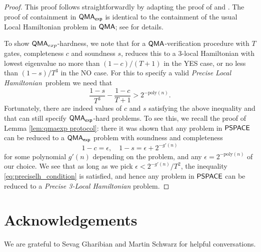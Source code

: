 \documentclass[11pt]{article}
\theoremstyle{definition}
\theoremstyle{remark}
\newcommand\QMA{{\sf{QMA}}}
\newcommand\PSPACE{{\sf{PSPACE}}}
\newcommand\QMAexp{{\sf{QMA}_{exp}}}
\newcommand\preciselh{\textit{Precise Local Hamiltonian}}
\newcommand\preciseilh[1]{\textit{Precise #1-Local Hamiltonian}}
\newcommand{\poly}{\textrm{poly}}
\begin{document}
\begin{proof}
This proof follows straightforwardly by adapting the proof of \cite{ksv02} and \cite{kr03}. The proof of containment in $\QMAexp$ is identical to the containment of the usual Local Hamiltonian problem in $\QMA$; see \cite{ksv02} for details.

To show $\QMA_{exp}$-hardness, we note that for a $\QMA$-verification procedure with $T$ gates, completeness $c$ and soundness $s$, \cite{kr03} reduces this to a 3-local Hamiltonian with lowest eigenvalue no more than $(1-c) / (T+1)$ in the YES case, or no less than $(1-s) / T^3$ in the NO case. For this to specify a valid \preciselh \ problem we need that
\begin{equation} \label{eq:preciselh_condition}
\frac{1-s}{T^3} - \frac{1-c}{T+1} > 2^{-\poly(n)}.
\end{equation}
Fortunately, there are indeed values of $c$ and $s$ satisfying the above inequality and that can still specify $\QMAexp$-hard problems. To see this, we recall the proof of Lemma \ref{lem:qmaexp protocol}: there it was shown that any problem in $\PSPACE$ can be reduced to a $\QMAexp$ problem with soundness and completeness
\begin{equation}
1-c = \epsilon,\quad 1 - s = \epsilon + 2^{-g'(n)}
\end{equation}
for some polynomial $g'(n)$ depending on the problem, and any $\epsilon = 2^{-\poly(n)}$ of our choice. We see that as long as we pick $\epsilon < 2^{-g'(n)}/T^2$, the inequality \ref{eq:preciselh_condition} is satisfied, and hence any problem in $\PSPACE$ can be reduced to a \preciseilh{3} problem.
\end{proof}
\section{Acknowledgements}
We are grateful to Sevag Gharibian and Martin Schwarz for helpful conversations.


\end{document}

